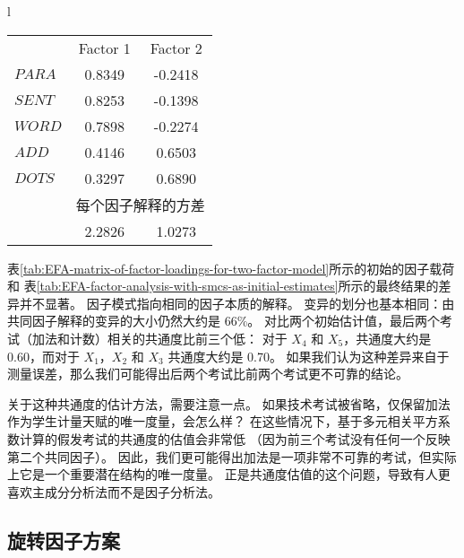 \begin{table}[htb]
{\begin{tabular}{l}
\begin{minipage}{0.5\textwidth}
\begin{tabular}{lcc}
                    & Factor 1 & Factor 2 \\ 
                    $ PARA $ & 0.8349 & -0.2418 \\
                    $ SENT $ & 0.8253 & -0.1398 \\
                    $ WORD $ & 0.7898 & -0.2274 \\
                    $ ADD  $ & 0.4146 &  0.6503 \\
                    $ DOTS $ & 0.3297 &  0.6890 \\
                    & \multicolumn{2}{c}{每个因子解释的方差} \\
                    & 2.2826 & 1.0273 \\ 
                \end{tabular}
            \end{minipage}
        \end{tabular}
    }
\end{table}

表\ref{tab:EFA-matrix-of-factor-loadings-for-two-factor-model}所示的初始的因子载荷和
表\ref{tab:EFA-factor-analysis-with-smcs-as-initial-estimates}所示的最终结果的差异并不显著。
因子模式指向相同的因子本质的解释。
变异的划分也基本相同：由共同因子解释的变异的大小仍然大约是 66\%。
对比两个初始估计值，最后两个考试（加法和计数）相关的共通度比前三个低：
对于 $ X_4 $ 和 $ X_5 $，共通度大约是 0.60，而对于 $ X_1 $，$ X_2 $ 和 $ X_3 $ 共通度大约是 0.70。
如果我们认为这种差异来自于测量误差，那么我们可能得出后两个考试比前两个考试更不可靠的结论。

关于这种共通度的估计方法，需要注意一点。
如果技术考试被省略，仅保留加法作为学生计量天赋的唯一度量，会怎么样？
在这些情况下，基于多元相关平方系数计算的假发考试的共通度的估值会非常低
（因为前三个考试没有任何一个反映第二个共同因子）。
因此，我们更可能得出加法是一项非常不可靠的考试，但实际上它是一个重要潜在结构的唯一度量。
正是共通度估值的这个问题，导致有人更喜欢主成分分析法而不是因子分析法。

\subsection{旋转因子方案}

